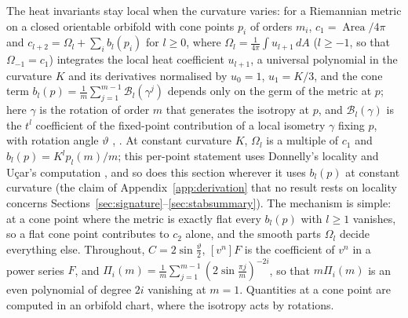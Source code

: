 \documentclass[pdflatex,sn-mathphys-num]{sn-jnl}
\theoremstyle{thmstyleone}%
\theoremstyle{thmstylethree}%
\newcommand{\Area}{\operatorname{Area}}
\begin{document}
The heat invariants stay local when the curvature varies: for a Riemannian metric on a closed orientable orbifold with cone points $p_i$ of orders $m_i$, $c_1=\Area/4\pi$ and $c_{l+2}=\Omega_l+\sum_ib_l(p_i)$ for $l\ge0$, where $\Omega_l=\frac1{4\pi}\int u_{l+1}\,dA$ ($l\ge-1$, so that $\Omega_{-1}=c_1$) integrates the local heat coefficient $u_{l+1}$, a universal polynomial in the curvature $K$ and its derivatives normalised by $u_0=1$, $u_1=K/3$, and the cone term $b_l(p)=\frac1m\sum_{j=1}^{m-1}\mathcal B_l(\gamma^j)$ depends only on the germ of the metric at $p$; here $\gamma$ is the rotation of order $m$ that generates the isotropy at $p$, and $\mathcal B_l(\gamma)$ is the $t^l$ coefficient of the fixed-point contribution of a local isometry $\gamma$ fixing $p$, with rotation angle $\vartheta$ \cite{donnelly1976}, \cite[4.1, Thm~4.8]{dggw2008}. At constant curvature $K$, $\Omega_l$ is a multiple of $c_1$ and $b_l(p)=K^lp_l(m)/m$; this per-point statement uses Donnelly's locality \cite[Thm~4.8]{dggw2008} and U\c{c}ar's computation \cite[Thm~4.20]{ucar2017}, and so does this section wherever it uses $b_l(p)$ at constant curvature (the claim of Appendix~\ref{app:derivation} that no result rests on locality concerns Sections~\ref{sec:signature}--\ref{sec:stabsummary}). The mechanism is simple: at a cone point where the metric is exactly flat every $b_l(p)$ with $l\ge1$ vanishes, so a flat cone point contributes to $c_2$ alone, and the smooth parts $\Omega_l$ decide everything else. Throughout, $C=2\sin\frac\vartheta2$, $[v^n]F$ is the coefficient of $v^n$ in a power series $F$, and $\Pi_i(m)=\frac1m\sum_{j=1}^{m-1}(2\sin\frac{\pi j}m)^{-2i}$, so that $m\Pi_i(m)$ is an even polynomial of degree $2i$ vanishing at $m=1$. Quantities at a cone point are computed in an orbifold chart, where the isotropy acts by rotations.
\end{document}
